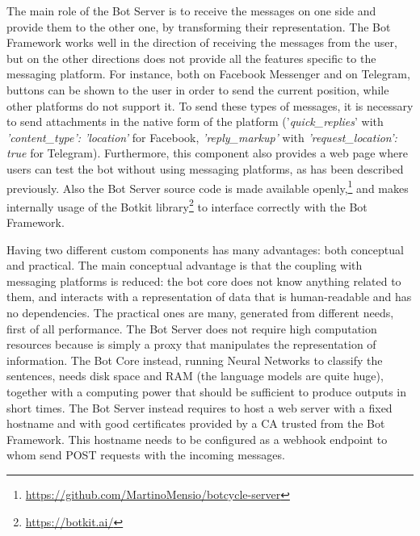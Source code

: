 The main role of the Bot Server is to receive the messages on one side and provide them to the other one, by transforming their representation. The Bot Framework works well in the direction of receiving the messages from the user, but on the other directions does not provide all the features specific to the messaging platform. For instance, both on Facebook Messenger and on Telegram, buttons can be shown to the user in order to send the current position, while other platforms do not support it. To send these types of messages, it is necessary to send attachments in the native form of the platform ('\textit{quick\_replies}' with \textit{'content\_type': 'location'} for Facebook, \textit{'reply\_markup'} with \textit{'request\_location': true} for Telegram). Furthermore, this component also provides a web page where users can test the bot without using messaging platforms, as has been described previously. Also the Bot Server source code is made available openly,\footnote{\url{https://github.com/MartinoMensio/botcycle-server}} and makes internally usage of the Botkit library\footnote{\url{https://botkit.ai/}} to interface correctly with the Bot Framework.

Having two different custom components has many advantages: both conceptual and practical. The main conceptual advantage is that the coupling with messaging platforms is reduced: the bot core does not know anything related to them, and interacts with a representation of data that is human-readable and has no dependencies. The practical ones are many, generated from different needs, first of all performance. The Bot Server does not require high computation resources because is simply a proxy that manipulates the representation of information. The Bot Core instead, running Neural Networks to classify the sentences, needs disk space and RAM (the language models are quite huge), together with a computing power that should be sufficient to produce outputs in short times. The Bot Server instead requires to host a web server with a fixed hostname and with good certificates provided by a CA trusted from the Bot Framework. This hostname needs to be configured as a webhook endpoint to whom send POST requests with the incoming messages.

